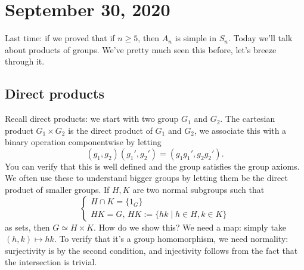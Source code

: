 \section{September 30, 2020}
Last time: if we proved that if $n\geq 5$, then $A_n$ is simple in $S_n$. Today we'll talk about products of groups. We've pretty much seen this before, let's breeze through it.
\subsection{Direct products}
Recall direct products: we start with two group $G_1$ and $G_2$. The cartesian product $G_1\times G_2$ is the direct product of $G_1$ and $G_2$, we associate this with a binary operation componentwise by letting \[
    (g_1,g_2)(g_1',g_2')=(g_1g_1',g_2g_2').
\] You can verify that this is well defined and the group satisfies the group axioms. We often use these to understand bigger groups by letting them be the direct product of smaller groups. If $H,K$ are two normal subgroups such that \[
\begin{cases}
    H \cap K =\{1_G\} \\
    HK=G,\, HK:=\{hk \mid h\in H,k\in K\} 
\end{cases}
\] as sets, then $G \simeq H \times K$. How do we show this? We need a map: simply take $(h,k) \mapsto hk$. To verify that it's a group homomorphism, we need normality: surjectivity is by the second condition, and injectivity follows from the fact that the intersection is trivial.

